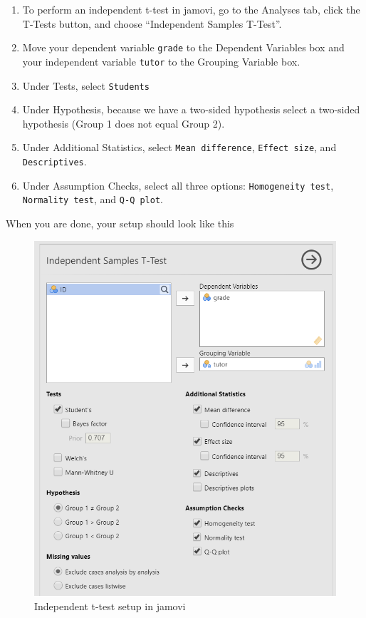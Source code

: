 \documentclass[
]{book}
\begin{document}
\begin{enumerate}
\def\labelenumi{\arabic{enumi}.}
\item
  To perform an independent t-test in jamovi, go to the Analyses tab, click the T-Tests button, and choose ``Independent Samples T-Test''.
\item
  Move your dependent variable \texttt{grade} to the Dependent Variables box and your independent variable \texttt{tutor} to the Grouping Variable box.
\item
  Under Tests, select \texttt{Student\textquotesingle{}s}
\item
  Under Hypothesis, because we have a two-sided hypothesis select a two-sided hypothesis (Group 1 does not equal Group 2).
\item
  Under Additional Statistics, select \texttt{Mean\ difference}, \texttt{Effect\ size}, and \texttt{Descriptives}.
\item
  Under Assumption Checks, select all three options: \texttt{Homogeneity\ test}, \texttt{Normality\ test}, and \texttt{Q-Q\ plot}.
\end{enumerate}

When you are done, your setup should look like this

\begin{figure}

{\centering \includegraphics[width=0.8\linewidth]{images/02-independent_t-test/independent_t-test_setup} 

}

\caption{Independent t-test setup in jamovi}\label{fig:unnamed-chunk-2}
\end{figure}
\end{document}
